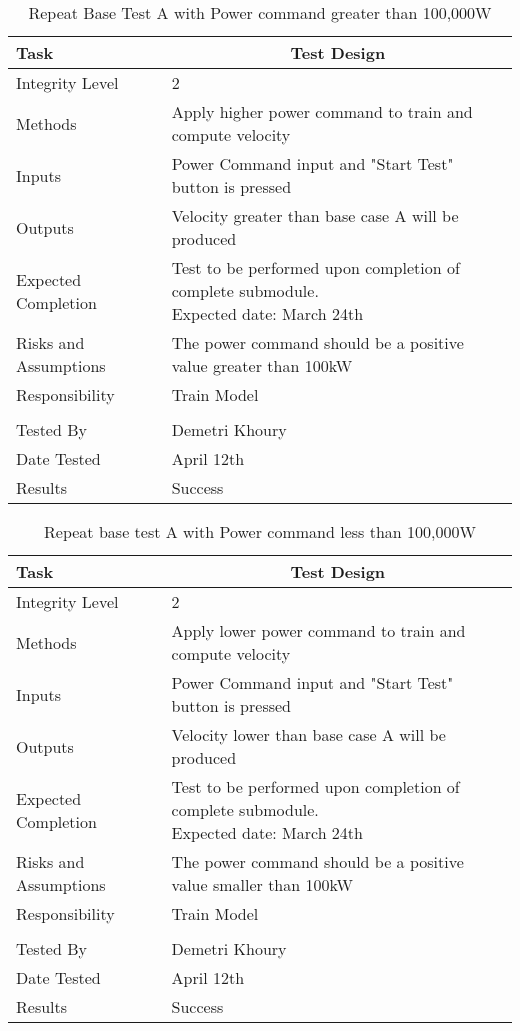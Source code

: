 \documentclass[]{article}
\begin{document}
	\begin{table}[H]
		\centering
		\caption{Repeat Base Test A with Power command greater than 100,000W}
		\begin{tabular}{|l|l|}
			\hline
			Task & \multicolumn{1}{c|}{Test Design} \\ \hline
			Integrity Level & 2 \\ \hline
			Methods & Apply higher power command to train and compute velocity  \\ \hline
			Inputs &  Power Command input and "Start Test" button is pressed \\ \hline
			Outputs &  Velocity greater than base case A will be produced  \\ \hline
			Expected Completion & \parbox[t]{10cm}{Test to be performed upon completion of complete submodule.\\ Expected date: March 24th}\\ \hline
			Risks and Assumptions & The power command should be a positive value greater than 100kW \\ \hline
			Responsibility & Train Model\\ \hline
			\\ \hline
			Tested By   &  Demetri Khoury\\	\hline
			Date Tested & \parbox[t]{10cm}{April 12th}\\ \hline
			Results & Success\\ \hline
		\end{tabular}
	\end{table}
    
    \begin{table}[H]
    	\centering
    	\caption{Repeat base test A with Power command less than 100,000W}
    	\begin{tabular}{|l|l|}
    		\hline
    		Task & \multicolumn{1}{c|}{Test Design} \\ \hline
    		Integrity Level & 2 \\ \hline
    		Methods & Apply lower power command to train and compute velocity  \\ \hline
    		Inputs &  Power Command input and "Start Test" button is pressed \\ \hline
    		Outputs &  Velocity lower than base case A will be produced  \\ \hline
    		Expected Completion & \parbox[t]{10cm}{Test to be performed upon completion of complete submodule.\\ Expected date: March 24th}\\ \hline
    		Risks and Assumptions & The power command should be a positive value smaller than 100kW \\ \hline
    		Responsibility & Train Model\\ \hline
    		\\ \hline
    		Tested By   &  Demetri Khoury\\	\hline
    		Date Tested & \parbox[t]{10cm}{April 12th}\\ \hline
    		Results &Success\\ \hline
    	\end{tabular}
    \end{table}
\end{document}

